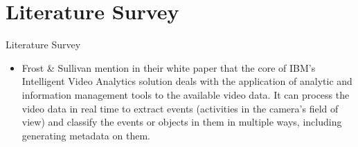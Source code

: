 \documentclass{beamer}
\begin{document}
\section{Literature Survey} 
\begin{frame}{Literature Survey}
  \begin{itemize}
   
    \item Frost \& Sullivan mention in their white paper that the core of IBM's Intelligent Video Analytics solution deals with the application of analytic and information management tools to the available video data. It can process the video data in real time to extract events (activities in the camera’s field of view) and classify the events or objects in them in multiple ways, including generating metadata on them.
  \end{itemize}
\end{frame}

\end{document}
